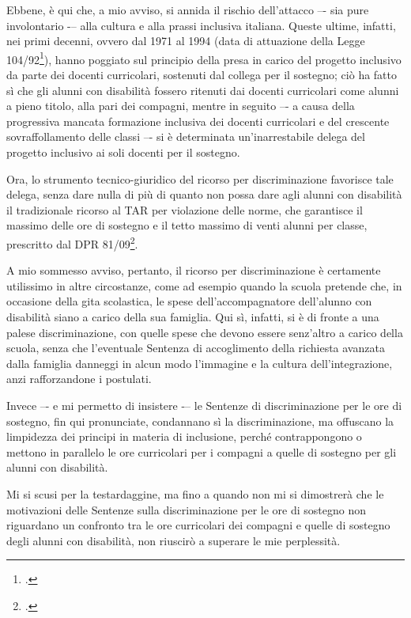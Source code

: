 Ebbene, è qui che, a mio avviso, si annida il rischio dell'attacco –- sia pure involontario -– alla cultura e alla prassi inclusiva italiana. Queste ultime, infatti, nei primi decenni, ovvero dal 1971 al 1994 (data di attuazione della Legge 104/92\footcite{Legge_104_92}), hanno poggiato sul principio della presa in carico del progetto inclusivo da parte dei docenti curricolari, sostenuti dal collega per il sostegno; ciò ha fatto sì che gli alunni con disabilità fossero ritenuti dai docenti curricolari come alunni a pieno titolo, alla pari dei compagni, mentre in seguito –- a causa della progressiva mancata formazione inclusiva dei docenti curricolari e del crescente sovraffollamento delle classi –- si è determinata un'inarrestabile delega del progetto inclusivo ai soli docenti per il sostegno.

Ora, lo strumento tecnico-giuridico del ricorso per discriminazione favorisce tale delega, senza dare nulla di più di quanto non possa dare agli alunni con disabilità il tradizionale ricorso al TAR per violazione delle norme, che garantisce il massimo delle ore di sostegno e il tetto massimo di venti alunni per classe, prescritto dal DPR 81/09\footcite{DPR_81_2009}.

A mio sommesso avviso, pertanto, il ricorso per discriminazione è certamente utilissimo in altre circostanze, come ad esempio quando la scuola pretende che, in occasione della gita scolastica, le spese dell'accompagnatore dell'alunno con disabilità siano a carico della sua famiglia. Qui sì, infatti, si è di fronte a una palese discriminazione, con quelle spese che devono essere senz'altro a carico della scuola, senza che l'eventuale Sentenza di accoglimento della richiesta avanzata dalla famiglia danneggi in alcun modo l'immagine e la cultura dell'integrazione, anzi rafforzandone i postulati.

Invece –- e mi permetto di insistere -– le Sentenze di discriminazione per le ore di sostegno, fin qui pronunciate, condannano sì la discriminazione, ma offuscano la limpidezza dei principi in materia di inclusione, perché contrappongono o mettono in parallelo le ore curricolari per i compagni a quelle di sostegno per gli alunni con disabilità.

Mi si scusi per la testardaggine, ma fino a quando non mi si dimostrerà che le motivazioni delle Sentenze sulla discriminazione per le ore di sostegno non riguardano un confronto tra le ore curricolari dei compagni e quelle di sostegno degli alunni con disabilità, non riuscirò a superare le mie perplessità.


